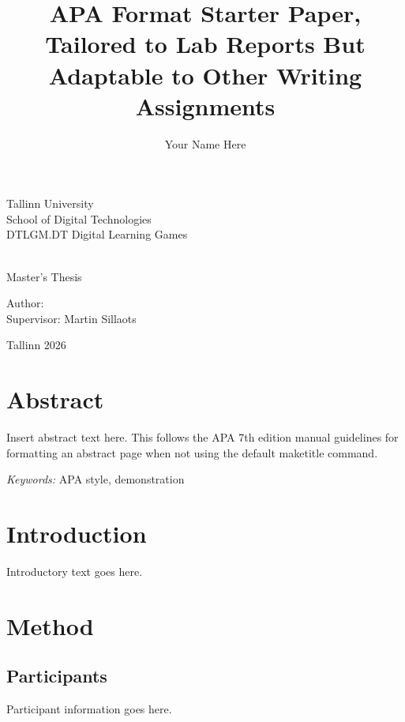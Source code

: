 \documentclass[man,12pt,floatsintext]{apa7}
\title{APA Format Starter Paper, Tailored to Lab Reports But Adaptable to Other Writing Assignments}
\author{Your Name Here}
\begin{document}
\begin{titlepage}
\makeatletter
    \centering
    \vspace*{2cm}
    {\large Tallinn University}\\
    \vspace{0.5cm}
    {\large School of Digital Technologies} \\
    \vspace{0.5cm}
    {\large DTLGM.DT Digital Learning Games}

    \vfill

    {\huge \textbf{ \@title }}\\
    \vspace{2cm}
    {\large Master's Thesis}

    \vfill
    \vfill

    \begin{flushright}
        {\large Author: \@author} \\
        \vspace{0.3cm}
        {\large Supervisor: Martin Sillaots}
    \end{flushright}

    \vfill

    {\large Tallinn 2026}
\makeatother
\end{titlepage}

\newpage
\section*{\centering Abstract} %
\noindent %
Insert abstract text here. This follows the APA 7th edition manual guidelines for formatting an abstract page when not using the default maketitle command. 

\vspace{0.5in} 
\noindent \textit{Keywords:} APA style, demonstration %

\newpage
\section{Introduction}
Introductory text goes here.

\section{Method}
\subsection{Participants}
Participant information goes here.
\end{document}
